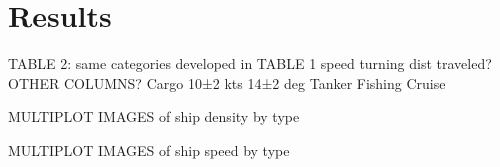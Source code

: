 \section{Results}



TABLE 2: same categories developed in TABLE 1
                 speed       turning      dist traveled?    OTHER COLUMNS?
  Cargo          10±2 kts     14±2 deg
  Tanker
  Fishing
  Cruise


MULTIPLOT IMAGES of ship density by type



MULTIPLOT IMAGES of ship speed by type


